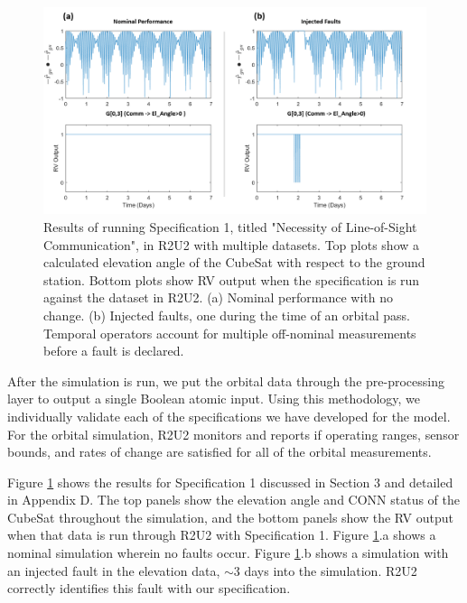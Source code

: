 \documentclass[conf]{new-aiaa}
\begin{document}
\begin{figure}[!ht]
\centering
\includegraphics[width=.8\textwidth]{Fig/LOSEL_Spec1.png}
\caption{Results of running Specification 1, titled "Necessity of Line-of-Sight Communication", in R2U2 with multiple datasets. Top plots show a calculated elevation angle of the CubeSat with respect to the ground station. Bottom plots show RV output when the specification is run against the dataset in R2U2. (a) Nominal performance with no change. (b) Injected faults, one during the time of an orbital pass. Temporal operators account for multiple off-nominal measurements before a fault is declared.}
\label{ConnElSpecResults}
\end{figure}

After the simulation is run, we put the orbital data through the pre-processing layer to output a single Boolean atomic input. Using this methodology, we individually validate each of the specifications we have developed for the model. For the orbital simulation, R2U2 monitors and reports if operating ranges, sensor bounds, and rates of change are satisfied for all of the orbital measurements.

Figure \ref{ConnElSpecResults} shows the results for Specification 1 discussed in Section 3 and detailed in Appendix D. The top panels show the elevation angle and CONN status of the CubeSat throughout the simulation, and the bottom panels show the RV output when that data is run through R2U2 with Specification 1. Figure \ref{ConnElSpecResults}.a shows a nominal simulation wherein no faults occur. Figure \ref{ConnElSpecResults}.b shows a simulation with an injected fault in the elevation data, $\sim$3 days into the simulation. R2U2 correctly identifies this fault with our specification.
\end{document}
